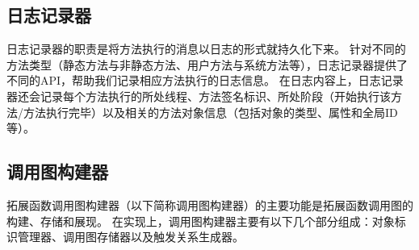 \begin{table*}[!ht]
{\begin{threeparttable}[b]
\begin{tabular}{|l|c|}
				
				
				
			\end{tabular}
			
			
		\end{threeparttable}
	}
\end{table*}











\subsection{日志记录器}

日志记录器的职责是将方法执行的消息以日志的形式就持久化下来。
针对不同的方法类型（静态方法与非静态方法、用户方法与系统方法等），日志记录器提供了不同的API，帮助我们记录相应方法执行的日志信息。
在日志内容上，日志记录器还会记录每个方法执行的所处线程、方法签名标识、所处阶段（开始执行该方法/方法执行完毕）以及相关的方法对象信息（包括对象的类型、属性和全局ID等）。



\subsection{调用图构建器}

拓展函数调用图构建器（以下简称调用图构建器）的主要功能是拓展函数调用图的构建、存储和展现。
在实现上，调用图构建器主要有以下几个部分组成：对象标识管理器、调用图存储器以及触发关系生成器。

